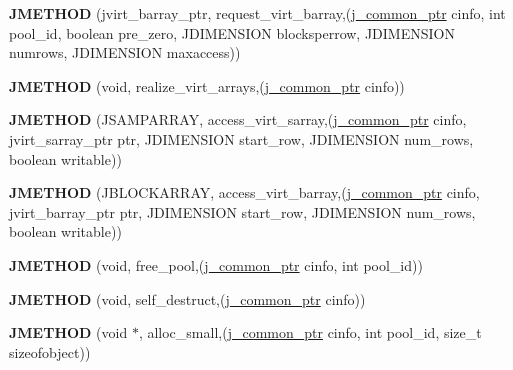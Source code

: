\begin{DoxyCompactItemize}
{\bfseries J\+M\+E\+T\+H\+OD} (jvirt\+\_\+barray\+\_\+ptr, request\+\_\+virt\+\_\+barray,(\hyperlink{structjpeg__common__struct}{j\+\_\+common\+\_\+ptr} cinfo, int pool\+\_\+id, boolean pre\+\_\+zero, J\+D\+I\+M\+E\+N\+S\+I\+ON blocksperrow, J\+D\+I\+M\+E\+N\+S\+I\+ON numrows, J\+D\+I\+M\+E\+N\+S\+I\+ON maxaccess))
\item 
\mbox{\label{structjpeg__memory__mgr_a35cc0c3b3ecbc7209cdc23b2255932d8}} 
{\bfseries J\+M\+E\+T\+H\+OD} (void, realize\+\_\+virt\+\_\+arrays,(\hyperlink{structjpeg__common__struct}{j\+\_\+common\+\_\+ptr} cinfo))
\item 
\mbox{\label{structjpeg__memory__mgr_a747ad4316a4794b13f9fdff4f6f699ca}} 
{\bfseries J\+M\+E\+T\+H\+OD} (J\+S\+A\+M\+P\+A\+R\+R\+AY, access\+\_\+virt\+\_\+sarray,(\hyperlink{structjpeg__common__struct}{j\+\_\+common\+\_\+ptr} cinfo, jvirt\+\_\+sarray\+\_\+ptr ptr, J\+D\+I\+M\+E\+N\+S\+I\+ON start\+\_\+row, J\+D\+I\+M\+E\+N\+S\+I\+ON num\+\_\+rows, boolean writable))
\item 
\mbox{\label{structjpeg__memory__mgr_aa460f4b500825e051306b8ce5583d052}} 
{\bfseries J\+M\+E\+T\+H\+OD} (J\+B\+L\+O\+C\+K\+A\+R\+R\+AY, access\+\_\+virt\+\_\+barray,(\hyperlink{structjpeg__common__struct}{j\+\_\+common\+\_\+ptr} cinfo, jvirt\+\_\+barray\+\_\+ptr ptr, J\+D\+I\+M\+E\+N\+S\+I\+ON start\+\_\+row, J\+D\+I\+M\+E\+N\+S\+I\+ON num\+\_\+rows, boolean writable))
\item 
\mbox{\label{structjpeg__memory__mgr_a7e7e063767441999982d22c5cc0e9423}} 
{\bfseries J\+M\+E\+T\+H\+OD} (void, free\+\_\+pool,(\hyperlink{structjpeg__common__struct}{j\+\_\+common\+\_\+ptr} cinfo, int pool\+\_\+id))
\item 
\mbox{\label{structjpeg__memory__mgr_ae80ddea0ba4f845f91d3a30e350b5f44}} 
{\bfseries J\+M\+E\+T\+H\+OD} (void, self\+\_\+destruct,(\hyperlink{structjpeg__common__struct}{j\+\_\+common\+\_\+ptr} cinfo))
\item 
\mbox{\label{structjpeg__memory__mgr_a9372ad24444dda23175cc9203105911c}} 
{\bfseries J\+M\+E\+T\+H\+OD} (void $\ast$, alloc\+\_\+small,(\hyperlink{structjpeg__common__struct}{j\+\_\+common\+\_\+ptr} cinfo, int pool\+\_\+id, size\+\_\+t sizeofobject))

\end{DoxyCompactItemize}

